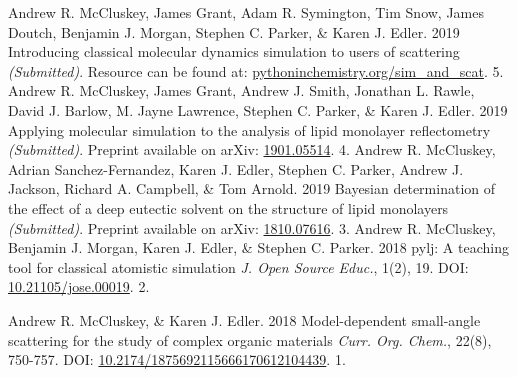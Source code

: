 \begin{cvpubys}
  \cvpuby
    {Andrew R. McCluskey, James Grant, Adam R. Symington, Tim Snow, James Doutch, Benjamin J. Morgan, Stephen C. Parker, \& Karen J. Edler.}
    {2019}
    {Introducing classical molecular dynamics simulation to users of scattering}
    {\emph{(Submitted)}. Resource can be found at: \href{https://pythoninchemistry.org/sim_and_scat}{pythoninchemistry.org/sim\_and\_scat}.}
    {5.}
  \cvpuby
    {Andrew R. McCluskey, James Grant, Andrew J. Smith, Jonathan L. Rawle, David J. Barlow, M. Jayne Lawrence, Stephen C. Parker, \& Karen J. Edler.}
    {2019}
    {Applying molecular simulation to the analysis of lipid monolayer reflectometry}
    {\emph{(Submitted)}. Preprint available on arXiv: \href{https://arxiv.org/abs/1901.05514}{1901.05514}.}
    {4.}
  \cvpuby
    {Andrew R. McCluskey, Adrian Sanchez-Fernandez, Karen J. Edler, Stephen C. Parker, Andrew J. Jackson, Richard A. Campbell, \& Tom Arnold.}
    {2019}
    {Bayesian determination of the effect of a deep eutectic solvent on the structure of lipid monolayers}
    {\emph{(Submitted)}. Preprint available on arXiv: \href{https://arxiv.org/abs/1810.07616}{1810.07616}.}
    {3.}
  \cvpuby
    {Andrew R. McCluskey, Benjamin J. Morgan, Karen J. Edler, \& Stephen C. Parker.}
    {2018}
    {pylj: A teaching tool for classical atomistic simulation}
    {\emph{J. Open Source Educ.}, 1(2), 19. DOI: \href{http://doi.org/10.21105/jose.00019}{10.21105/jose.00019}.}
    {2.}
  \end{cvpubys}
  \begin{cvpubys}
  \cvpuby
    {Andrew R. McCluskey, \& Karen J. Edler.}
    {2018}
    {Model-dependent small-angle scattering for the study of complex organic materials}
    {\emph{Curr. Org. Chem.}, 22(8), 750-757. DOI: \href{http://doi.org/10.2174/1875692115666170612104439}{10.2174/1875692115666170612104439}.}
    {1.}
\end{cvpubys}
